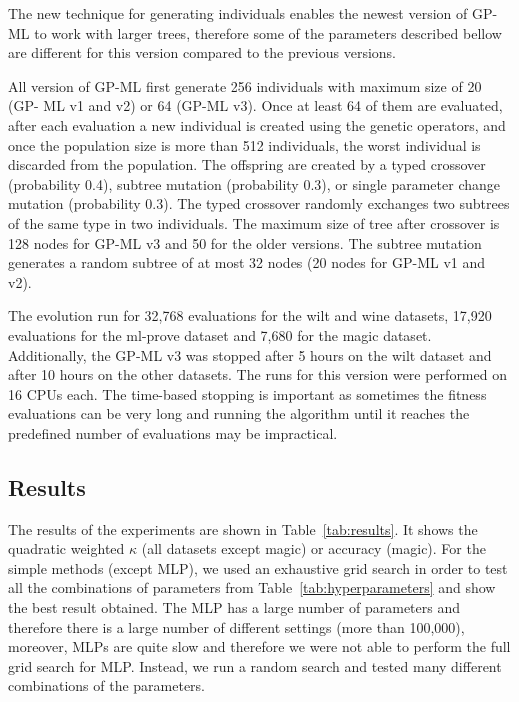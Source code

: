 \documentclass{ws-ijait}
\begin{document}
The new technique for generating individuals enables the newest version of 
GP-ML to work with larger trees, therefore some of the parameters described
bellow are different for this version compared to the previous versions.

All version of GP-ML first generate 256 individuals with maximum size of 20 (GP-
ML v1 and v2) or 64 (GP-ML v3). Once at least 64 of them are evaluated, after
each evaluation a new individual is created using the genetic operators, and
once the population size is more than 512 individuals, the worst individual is
discarded from the population. The offspring are created by a typed crossover
(probability 0.4), subtree mutation (probability 0.3), or single parameter
change mutation (probability 0.3). The typed crossover randomly exchanges two
subtrees of the same type in two individuals. The maximum size of tree after
crossover is 128 nodes for GP-ML v3 and 50 for the older versions. The subtree
mutation generates a random subtree of at most 32 nodes (20 nodes for GP-ML v1
and v2).

The evolution run for 32,768 evaluations for the wilt and wine datasets, 17,920
evaluations for the ml-prove dataset and 7,680 for the magic dataset.
Additionally, the GP-ML v3 was stopped after 5 hours on the wilt dataset and
after 10 hours on the other datasets. The runs for this version were performed
on 16 CPUs each. The time-based stopping is important as sometimes the fitness
evaluations can be very long and running the algorithm until it reaches the 
predefined number of evaluations may be impractical.

\subsection{Results}

The results of the experiments are shown in Table~\ref{tab:results}. It shows
the quadratic weighted $\kappa$ (all datasets except magic) or accuracy (magic).
For the simple methods (except MLP), we used an exhaustive grid search in order
to test all the combinations of parameters from Table~\ref{tab:hyperparameters}
and show the best result obtained. The MLP has a large number of parameters and
therefore there is a large number of different settings (more than 100,000),
moreover, MLPs are quite slow and therefore we were not able to perform the full
grid search for MLP. Instead, we run a random search and tested many different
combinations of the parameters.
\end{document}
